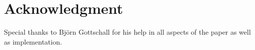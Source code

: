 \section*{Acknowledgment}\label{sec:acknowledgment}
Special thanks to Björn Gottschall for his help in all aspects of the paper as well as implementation.